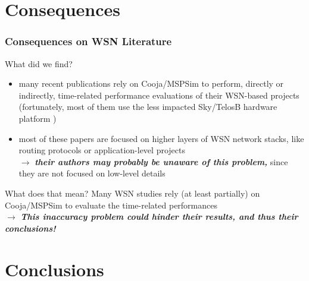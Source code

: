 \documentclass[10pt,c]{beamer}
\renewcommand{\emph}[1]{\textbf{\textit{#1}}}
\begin{document}

\section{Consequences}

\begin{frame}
\vspace{-0.25cm}
\frametitle{Consequences on WSN Literature}
\begin{block}{What did we find?}
\begin{itemize}
\item many recent publications rely on Cooja/MSPSim to perform, directly
or indirectly, time-related performance evaluations of their WSN-based
projects (fortunately, most of them use the less impacted Sky/TelosB
hardware platform
\cite{Constrain-Routing-Trees-2014} \cite{Co-RPL-2014} \cite{DINAS-2014}
\cite{Efficient-Distrib-Svc-Discovery-2014} \cite{IETF-Routing-WSN-2014}
\cite{TinySDN-2014} \cite{Trickle-L2-2014}
\cite{Visual-Sensor-Networks-2014})
\item most of these papers are focused on higher layers of WSN network
stacks, like routing protocols 
\cite{Constrain-Routing-Trees-2014} \cite{Co-RPL-2014}
\cite{IETF-Routing-WSN-2014} \cite{Trickle-L2-2014}
or application-level projects
\cite{DINAS-2014} \cite{Efficient-Distrib-Svc-Discovery-2014}
\cite{Visual-Sensor-Networks-2014} \cite{Key-Mgmt-2015} \\
$\rightarrow$ \emph{their authors may probably be unaware of this problem,}
since they are not focused on low-level details
\end{itemize}
\end{block}
\vspace{-0.25cm}
\begin{alertblock}{What does that mean?}
Many WSN studies rely (at least partially) on Cooja/MSPSim to evaluate
the time-related performances \\
$\rightarrow$ \emph{This inaccuracy problem could hinder their results,
and thus their conclusions!}
\end{alertblock}
\end{frame}


\section{Conclusions}
\end{document}
